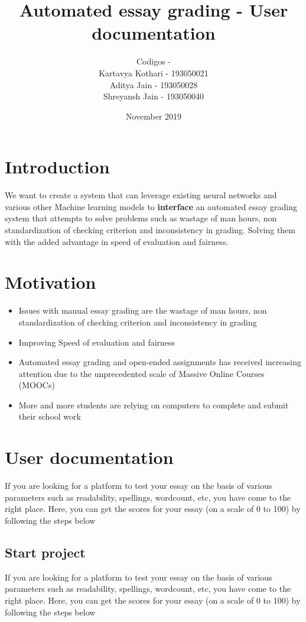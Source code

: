 \documentclass{article}
\title{\Huge Automated essay grading - User documentation}
\author{Codigos - \\Kartavya Kothari - 193050021\\Aditya Jain - 193050028\\Shreyansh Jain - 193050040}
\date{November 2019}
\begin{document}
\maketitle

\newpage
\section{Introduction}
We want to create a system that can leverage existing neural networks and various other Machine learning models to \textbf{interface} an automated essay grading system that attempts to solve problems such as wastage of man hours, non standardization of checking criterion and inconsistency in grading. Solving them with the added advantage in speed of evaluation and fairness.

\section{Motivation}
\begin{itemize}
    \item Issues with manual essay grading are the wastage of man hours, non standardization of checking criterion and inconsistency in grading
    \item Improving Speed of evaluation and fairness
    \item Automated essay grading and open-ended assignments has received increasing attention due to the unprecedented scale of Massive Online Courses (MOOCs)
    \item More and more students are relying on computers to complete
and submit their school work
\end{itemize}

\section{User documentation}
If you are looking for a platform to test your essay on the basis of various parameters such as readability, spellings, wordcount, etc, you have come to the right place.
Here, you can get the scores for your essay (on a scale of 0 to 100) by following the steps below

\subsection{Start project}
If you are looking for a platform to test your essay on the basis of various parameters such as readability, spellings, wordcount, etc, you have come to the right place. Here, you can get the scores for your essay (on a scale of 0 to 100) by following the steps below
\end{document}
